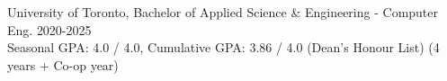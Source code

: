 University of Toronto, Bachelor of Applied Science \& Engineering - Computer Eng. \hfill{2020-2025}
\\ Seasonal GPA: 4.0 / 4.0, Cumulative GPA: 3.86 / 4.0 (Dean’s Honour List) \hfill{(4 years + Co-op year)}